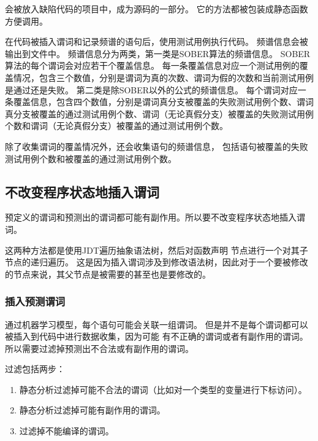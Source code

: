 会被放入缺陷代码的项目中，成为源码的一部分。
它的方法都被包装成静态函数方便调用。

在代码被插入谓词和记录频谱的语句后，使用测试用例执行代码。
频谱信息会被输出到文件中。
频谱信息分为两类，第一类是SOBER算法的频谱信息。
SOBER算法的每个谓词会对应若干个覆盖信息。
每一条覆盖信息对应一个测试用例的覆盖情况，包含三个数值，分别是谓词为真的次数、谓词为假的次数和当前测试用例是通过还是失败。
第二类是除SOBER以外的公式的频谱信息。
每个谓词对应一条覆盖信息，包含四个数值，分别是谓词真分支被覆盖的失败测试用例个数、谓词真分支被覆盖的通过测试用例个数、谓词（无论真假分支）被覆盖的失败测试用例个数和谓词（无论真假分支）被覆盖的通过测试用例个数。

除了收集谓词的覆盖情况外，还会收集语句的频谱信息，
包括语句被覆盖的失败测试用例个数和被覆盖的通过测试用例个数。

\subsection{不改变程序状态地插入谓词}

预定义的谓词和预测出的谓词都可能有副作用。所以要不改变程序状态地插入谓词。

这两种方法都是使用JDT遍历抽象语法树，然后对函数声明  节点进行一个对其子节点的递归遍历。
这是因为插入谓词涉及到修改语法树，因此对于一个要被修改的节点来说，其父节点是被需要的甚至也是要修改的。

\subsubsection{插入预测谓词}

通过机器学习模型，每个语句可能会关联一组谓词。
但是并不是每个谓词都可以被插入到代码中进行数据收集，因为可能
有不正确的谓词或者有副作用的谓词。
所以需要过滤掉预测出不合法或有副作用的谓词。

过滤包括两步：
\begin{enumerate}
\item 静态分析过滤掉可能不合法的谓词（比如对一个类型的变量进行下标访问）。
\item 静态分析过滤掉可能有副作用的谓词。
\item 过滤掉不能编译的谓词。
\end{enumerate}

